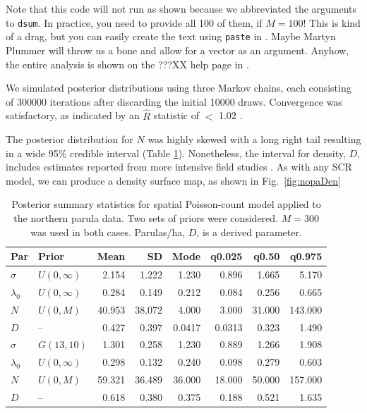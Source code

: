 Note that this code will not run as shown because we abbreviated the
arguments to \verb+dsum+. In practice, you need to provide all 100 of
them, if $M=100$! This is kind of a drag, but you can easily create
the text using \verb+paste+ in \R. Maybe Martyn Plummer will throw us
a bone and allow for a vector as an argument. Anyhow, the entire
analysis is shown on the ???XX help page in \scrbook.


We simulated posterior
distributions using three Markov chains,
each consisting of 300000 iterations after discarding the initial 10000
draws. Convergence was satisfactory, as indicated by an $\hat{R}$
statistic of $<$ 1.02 \citep{gelman_rubin:1992}.


The posterior distribution for
$N$ was highly skewed with a long right tail resulting in a wide 95\%
credible interval (Table \ref{t:nopaPosts}). Nonetheless, the interval
for density, $D$, includes estimates reported from more intensive field
studies \citep{moldenhaer_regelski:1996}. As with any SCR model,
we can produce a density surface map, as shown in Fig.~\ref{fig:nopaDen}


\begin{table}%
  \caption{Posterior summary statistics for spatial Poisson-count
    model applied to the northern parula data. Two sets of priors were
    considered. $M=300$ was used in both cases. Parulas/ha, $D$, is a
    derived parameter.}
  \scriptsize
  \begin{tabular}{l l rrrrrr}
    \hline
    Par        & Prior                  & Mean  & SD    & Mode   & q0.025  & q0.50  & q0.975  \\
    \hline
    $\sigma$   & $U(0, \infty)$   & 2.154   & 1.222  & 1.230   & 0.896   & 1.665   & 5.170    \\
    $\lambda_0$ & $U(0, \infty)$  & 0.284   & 0.149 & 0.212    & 0.084  & 0.256  & 0.665   \\
    $N$        & $U(0, M)$             & 40.953   & 38.072  & 4.000  & 3.000       & 31.000     & 143.000     \\
    $D$        &  --                   & 0.427    & 0.397 & 0.0417   & 0.0313  & 0.323  & 1.490    \\
    \hline
    $\sigma$    & $G(13, 10)$          & 1.301    & 0.258 & 1.230    & 0.889   & 1.266   & 1.908    \\
    $\lambda_0$ & $U(0, \infty)$ & 0.298    & 0.132 & 0.240    & 0.098   & 0.279  & 0.603   \\
    $N$         & $U(0, M)$            & 59.321   & 36.489  & 36.000 & 18.000      & 50.000     & 157.000     \\
    $D$         &  --                  & 0.618    & 0.380 & 0.375   & 0.188   & 0.521  & 1.635    \\
    \hline
  \end{tabular}
  \label{t:nopaPosts}
\vspace{0.5cm}
\end{table}


